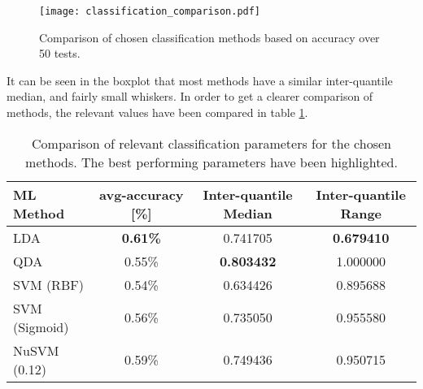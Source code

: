 \documentclass[../main.tex]{subfiles}
\begin{document}
\begin{figure}[H]
\begin{center}
\texttt{[image: classification\_comparison.pdf]}
\caption{Comparison of chosen classification methods based on accuracy over 50 tests.}
\label{fig:classification_comparison}
\end{center}
\end{figure}

It can be seen in the boxplot that most methods have a similar inter-quantile median, and fairly small whiskers.
In order to get a clearer comparison of methods, the relevant values have been compared in table \ref{tab:classification_comparison}.  

\begin{table}[H]
\begin{center}
\begin{tabular}{ |l|c|c|c| } 
 \hline
 ML Method & avg-accuracy [\%] & Inter-quantile Median & Inter-quantile Range \\ 
 \hline
 LDA & \textbf{0.61\%}           & 0.741705 & \textbf{0.679410} \\ 
 QDA & 0.55\%           & \textbf{0.803432} & 1.000000 \\ 
 SVM (RBF) & 0.54\%     & 0.634426 & 0.895688 \\ 
 SVM (Sigmoid) & 0.56\% & 0.735050 & 0.955580 \\ 
 NuSVM (0.12) & 0.59\%  & 0.749436 & 0.950715 \\ 
 \hline
\end{tabular}
\caption{Comparison of relevant classification parameters for the chosen methods. The best performing parameters have been highlighted.}
\label{tab:classification_comparison}
\end{center}
\end{table}

\end{document}
